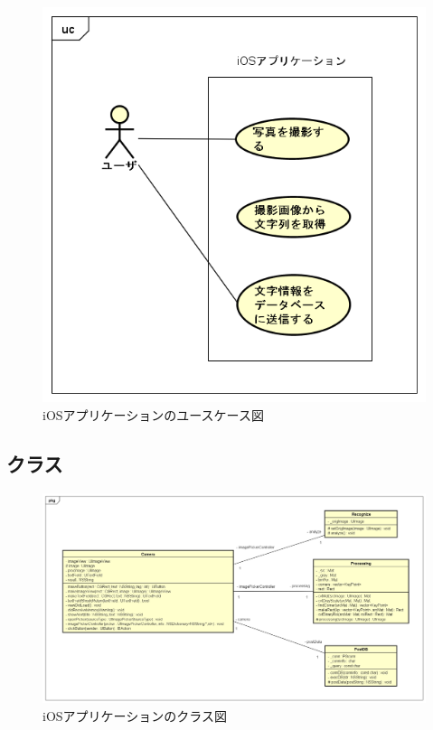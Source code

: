 \begin{figure}
\begin{center}
\includegraphics[width=14cm]{fig/usecase_ios.png}
\end{center}
\caption{iOSアプリケーションのユースケース図}
\end{figure}

\subsection{クラス}
\begin{figure}
\begin{center}
\includegraphics[width=17cm]{fig/class_ios.png}
\end{center}
\caption{iOSアプリケーションのクラス図}
\end{figure}

